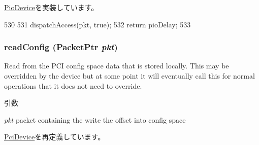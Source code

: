 \hyperlink{classPioDevice_a842312590432036092c422c87a442358}{PioDevice}を実装しています。


\begin{DoxyCode}
530 {
531     dispatchAccess(pkt, true);
532     return pioDelay;
533 }
\end{DoxyCode}
\hypertarget{classIdeController_a9dfb5284eadd79fffef97ba1bd69f3c4}{
\subsubsection[{readConfig}]{ readConfig ({\bf PacketPtr} {\em pkt})}}
\label{classIdeController_a9dfb5284eadd79fffef97ba1bd69f3c4}
Read from the PCI config space data that is stored locally. This may be overridden by the device but at some point it will eventually call this for normal operations that it does not need to override. 
\begin{DoxyParams}{引数}
\item[{\em pkt}]packet containing the write the offset into config space \end{DoxyParams}


\hyperlink{classPciDevice_a9dfb5284eadd79fffef97ba1bd69f3c4}{PciDevice}を再定義しています。


